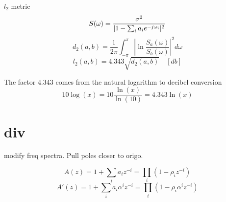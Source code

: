 \begin{definition} $l_2$ metric \cite{gray76}
\begin{equation}
	S(\omega) = \frac{\sigma^2}{\lvert1-\sum_{i}a_i e^{-j\omega_i}\rvert^2}
\end{equation}
\begin{equation}
	d_2(a,b) = \frac{1}{2\pi}\int_{-\pi}^{\pi}\left\lvert\ln \frac{S_a(\omega)}{S_b(\omega)}\right\rvert^2 d\omega
\end{equation}
\begin{equation}
	l_2(a,b)  = 4.343 \sqrt{d_2(a,b)} \quad [db]
\end{equation}
\end{definition}

The factor $4.343$ comes from the natural logarithm to decibel conversion
\begin{equation}
	10\log(x) = 10 \frac{\ln(x)}{\ln(10)} = 4.343\ln(x) 
\end{equation}




\section{div} %
\label{sec:div}
modify freq spectra. Pull poles closer to origo.

\begin{equation}
	A(z) = 1+ \sum_{i} a_i z^{-i} = \prod_i (1-\rho_i z^{-i})
\end{equation}
\begin{equation}
	A'(z) = 1+ \sum_{i} a_i \alpha^i z^{-i} = \prod_i (1-\rho_i \alpha^i z^{-i})
\end{equation}

